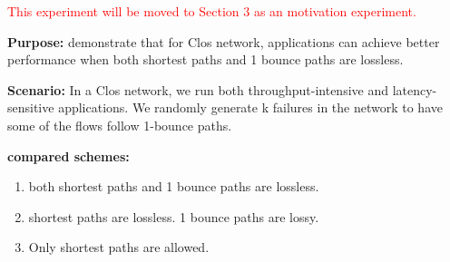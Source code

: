 \textcolor{red}{This experiment will be moved to Section 3 as an motivation experiment.}

\textbf{Purpose:} demonstrate that for Clos network, applications can achieve better performance when both shortest paths and 1 bounce paths are lossless.

\textbf{Scenario:} In a Clos network, we run both throughput-intensive and latency-sensitive applications. We randomly generate k failures in the network to have some of the flows follow 1-bounce paths.

 \textbf{compared schemes:}
 \begin{enumerate}
 	\item both shortest paths and  1 bounce paths are lossless.
 	\item shortest paths are lossless. 1 bounce paths are lossy.
 	\item Only shortest paths are allowed.
 \end{enumerate}
  
%   
%   
    
    
  